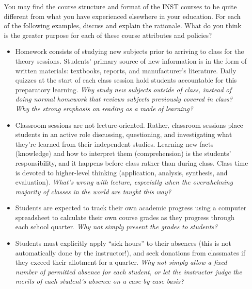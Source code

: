 

You may find the course structure and format of the INST courses to be quite different from what you have experienced elsewhere in your education.  For each of the following examples, discuss and explain the rationale.  What do you think is the greater purpose for each of these course attributes and policies?

\vskip 10pt

\begin{itemize}
\item{} Homework consists of studying new subjects prior to arriving to class for the theory sessions.  Students' primary source of new information is in the form of written materials: textbooks, reports, and manufacturer's literature.  Daily quizzes at the start of each class session hold students accountable for this preparatory learning.  {\it Why study new subjects outside of class, instead of doing normal homework that reviews subjects previously covered in class?  Why the strong emphasis on reading as a mode of learning?}
\vskip 20pt
\item{} Classroom sessions are not lecture-oriented.  Rather, classroom sessions place students in an active role discussing, questioning, and investigating what they're learned from their independent studies.  Learning new facts (knowledge) and how to interpret them (comprehension) is the students' responsibility, and it happens before class rather than during class.  Class time is devoted to higher-level thinking (application, analysis, synthesis, and evaluation).  {\it What's wrong with lecture, especially when the overwhelming majority of classes in the world are taught this way?}
\vskip 20pt
\item{} Students are expected to track their own academic progress using a computer spreadsheet to calculate their own course grades as they progress through each school quarter.  {\it Why not simply present the grades to students?}
\vskip 20pt
\item{} Students must explicitly apply ``sick hours'' to their absences (this is not automatically done by the instructor!), and seek donations from classmates if they exceed their allotment for a quarter.  {\it Why not simply allow a fixed number of permitted absence for each student, or let the instructor judge the merits of each student's absence on a case-by-case basis?}

\end{itemize}

